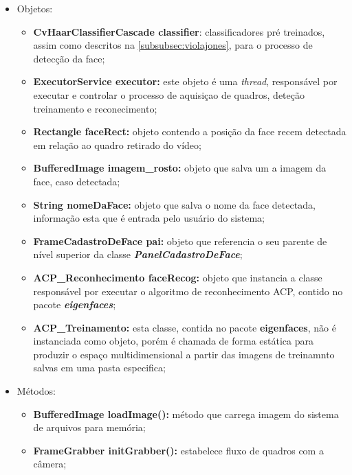 \begin{itemize}
	\item Objetos:
	\begin{itemize}
		\item \textbf{CvHaarClassifierCascade classifier}: classificadores pré treinados, assim como descritos na \autoref{subsubsec:violajones}, para o processo de detecção da face;
		
		\item \textbf{ExecutorService executor:} este objeto é uma \textit{thread}, responsável por executar e controlar o processo de aquisiçao de quadros, deteção treinamento e reconecimento;
		
		\item \textbf{Rectangle faceRect:} objeto contendo a posição da face recem detectada em relação ao quadro retirado do vídeo;
		
		\item \textbf{BufferedImage imagem\_rosto:} objeto que salva um a imagem da face, caso detectada;
		
		\item \textbf{String nomeDaFace:} objeto que salva o nome da face detectada, informação esta que é entrada pelo usuário do sistema;
		
		\item \textbf{FrameCadastroDeFace pai:} objeto que referencia o seu parente de nível superior da classe \textbf{\textit{PanelCadastroDeFace}};
		
		\item \textbf{ACP\_Reconhecimento faceRecog:} objeto que instancia a classe responsável por executar o algoritmo de reconhecimento ACP, contido no pacote \textbf{\textit{eigenfaces}};
		
		\item \textbf{ACP\_Treinamento:} esta classe, contida no pacote \textbf{eigenfaces}, não é instanciada como objeto, porém é chamada de forma estática para produzir o espaço multidimensional a partir das imagens de treinamnto salvas em uma pasta especifica;
		
	\end{itemize}
	
	\item Métodos:
	\begin{itemize}
		\item \textbf{BufferedImage loadImage():} método que carrega imagem do sistema de arquivos para memória;
		
		\item \textbf{FrameGrabber initGrabber():} estabelece fluxo de quadros com a câmera;
		

\end{itemize}
\end{itemize}

